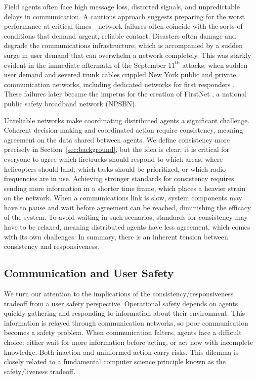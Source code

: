 \documentclass[]             %
{NASA}                       %
\theoremstyle{definition}
\begin{document}
Field agents often face high message loss, distorted signals, and
unpredictable delays in communication. A cautious approach suggests
preparing for the worst performance at critical times---network
failures often coincide with the sorts of conditions that demand
urgent, reliable contact. Disasters often damage and degrade the
communications infrastructure, which is accompanied by a sudden surge
in user demand that can overwhelm a network completely. This was
starkly evident in the immediate aftermath of the September
$11^\textrm{th}$ attacks, when sudden user demand and severed trunk
cables crippled New York public and private communication networks,
including dedicated networks for first responders
\cite{2011:Reardon}. These failures later became the impetus for the
creation of FirstNet \cite{2021:firstnet, 2021:firstnet2}, a national
public safety broadband network (NPSBN).

Unreliable networks make coordinating distributed agents a significant
challenge. Coherent decision-making and coordinated action require
consistency, meaning agreement on the data shared between agents. We
define consistency more precisely in Section~\ref{sec:background}, but
the idea is clear: it is critical for everyone to agree which
firetrucks should respond to which areas, where helicopters should
land, which tasks should be prioritized, or which radio frequencies
are in use. Achieving stronger standards for consistency requires
sending more information in a shorter time frame, which places a
heavier strain on the network. When a communications link is slow,
system components may have to pause and wait before agreement can be
reached, diminishing the efficacy of the system. To avoid waiting in
such scenarios, standards for consistency may have to be relaxed,
meaning distributed agents have less agreement, which comes with its
own challenges. In summary, there is an inherent tension between
consistency and responsiveness.

\subsection{Communication and User Safety}
\label{ssec:communication-and-safety}
We turn our attention to the implications of the
consistency/responsiveness tradeoff from a user safety
perspective. Operational safety depends on agents quickly gathering
and responding to information about their environment. This
information is relayed through communication networks, so poor
communication becomes a safety problem. When communication falters,
agents face a difficult choice: either wait for more information
before acting, or act now with incomplete knowledge. Both inaction and
uninformed action carry risks. This dilemma is closely related to a
fundamental computer science principle known as the safety/liveness
tradeoff.
\end{document}
